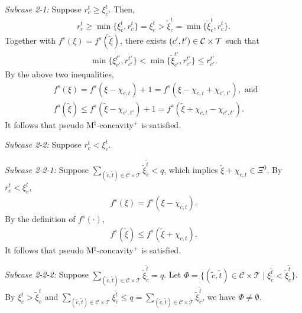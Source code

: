 \documentclass[12pt]{amsart}
\newcommand{\corigin}{c'}
\theoremstyle{remark}
\begin{document}
\smallskip
\noindent
\emph{Subcase 2-1:}
Suppose $r_c^t\geq \xi_c^t$. Then,
\begin{align*}
r_c^t\geq \min\{ \xi_c^t, r_c^t\}=\xi_c^t>\tilde \xi_c^t=\min\{ \tilde \xi_c^t, r_c^t\}.
\end{align*}
Together with $f^s(\xi)=f^s(\tilde \xi)$, there exists $(\corigin,t')\in \calc\times \calt$ such that
\begin{align*}
\min\{ \xi_{\corigin}^{t'}, r_{\corigin}^{t'}\}<\min\{ \tilde \xi_{\corigin}^{t'}, r_{\corigin}^{t'}\}\leq r_{\corigin}^{t'}.
\end{align*}
By the above two inequalities,
\begin{align*}
&f^s(\xi)=f^s(\xi-\chi_{c,t})+1=f^s(\xi-\chi_{c,t}+\chi_{\corigin, t'}), \text{ and } \\
&f^s(\tilde \xi)\leq f^s(\tilde \xi-\chi_{\corigin, t'})+1=f^s(\tilde \xi+\chi_{c,t}-\chi_{\corigin, t'}).
\end{align*}
It follows that pseudo M$^\natural$-concavity$^+$ is satisfied.

\smallskip
\noindent
\emph{Subcase 2-2:}
Suppose $r_c^t<\xi_c^t$.

\smallskip
\noindent
\emph{Subcase 2-2-1:}
Suppose $\sum_{(\tilde c,\tilde t)\in \mathcal{C}\times \mathcal{T}}\tilde \xi_{\tilde c}^{\tilde t}<q$, which implies $\tilde \xi+\chi_{c,t}\in \Xi^0$. By $r_c^t<\xi_c^t$,
\begin{align*}
f^s(\xi)=f^s(\xi-\chi_{c,t}).
\end{align*}
By the definition of $f^s(\cdot)$,
\begin{align*}
f^s(\tilde \xi)\leq f^s(\tilde \xi+\chi_{c,t}).
\end{align*}
It follows that pseudo M$^\natural$-concavity$^+$ is satisfied.

\smallskip
\noindent
\emph{Subcase 2-2-2:}
Suppose $\sum_{(\tilde c,\tilde t)\in \mathcal{C}\times \mathcal{T}}\tilde \xi_{\tilde c}^{\tilde t}=q$. Let $\Phi=\{(\tilde c, \tilde t)\in \mathcal{C}\times \mathcal{T} \mid \xi_{\tilde c}^{\tilde t}<\tilde \xi_{\tilde c}^{\tilde t}\}$. By $\xi_c^t>\tilde \xi_c^t$ and $\sum_{(\tilde c,\tilde t)\in \mathcal{C}\times \mathcal{T}}\xi_{\tilde c}^{\tilde t}\leq q=\sum_{(\tilde c,\tilde t)\in \mathcal{C}\times \mathcal{T}}\tilde \xi_{\tilde c}^{\tilde t}$, we have $\Phi \neq \emptyset$.
\end{document}

